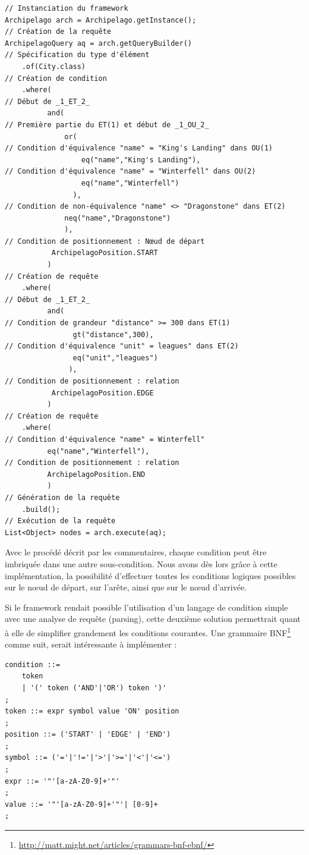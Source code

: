 \documentclass[a4paper,fleqn,12pt,oneside]{report}
\begin{document}
\begin{lstlisting}
// Instanciation du framework
Archipelago arch = Archipelago.getInstance();
// Création de la requête
ArchipelagoQuery aq = arch.getQueryBuilder()  
// Spécification du type d'élément
    .of(City.class) 						  
// Création de condition
    .where(									  
// Début de _1_ET_2_
    	  and( 							      
// Première partie du ET(1) et début de _1_OU_2_
              or(							  
// Condition d'équivalence "name" = "King's Landing" dans OU(1)
      	          eq("name","King's Landing"),
// Condition d'équivalence "name" = "Winterfell" dans OU(2)
    	          eq("name","Winterfell")     
    	        ),
// Condition de non-équivalence "name" <> "Dragonstone" dans ET(2)
    	      neq("name","Dragonstone")       
    	      ),
// Condition de positionnement : Nœud de départ
    	   ArchipelagoPosition.START          
    	  )
// Création de requête
    .where(     
// Début de _1_ET_2_                                  
          and(        
// Condition de grandeur "distance" >= 300 dans ET(1)                                 
      	        gt("distance",300),
// Condition d'équivalence "unit" = leagues" dans ET(2)           
    	        eq("unit","leagues")          
    	       ),
// Condition de positionnement : relation
    	   ArchipelagoPosition.EDGE           
    	  )
// Création de requête
    .where(
// Condition d'équivalence "name" = Winterfell"
          eq("name","Winterfell"),
// Condition de positionnement : relation
    	  ArchipelagoPosition.END
    	  )
// Génération de la requête
    .build();
// Exécution de la requête
List<Object> nodes = arch.execute(aq);

\end{lstlisting} 
Avec le procédé décrit par les commentaires, chaque condition peut être imbriquée dans une autre sous-condition. Nous avons dès lors grâce à cette implémentation, la possibilité d'effectuer toutes les conditions logiques possibles sur le nœud de départ, sur l'arête, ainsi que sur le nœud d'arrivée.

Si le framework rendait possible l'utilisation d'un langage de condition simple avec une analyse de requête (parsing), cette deuxième solution permettrait quant à elle de simplifier grandement les conditions courantes. Une grammaire BNF\footnote{\url{http://matt.might.net/articles/grammars-bnf-ebnf/}} comme suit, serait intéressante à implémenter :

\begin{lstlisting}
condition ::=
	token
	| '(' token ('AND'|'OR') token ')' 
;
token ::= expr symbol value 'ON' position 
;
position ::= ('START' | 'EDGE' | 'END') 
;
symbol ::= ('='|'!='|'>'|'>='|'<'|'<=') 
;
expr ::= '"'[a-zA-Z0-9]+'"' 
;
value ::= '"'[a-zA-Z0-9]+'"'| [0-9]+ 
;
\end{lstlisting}
\end{document}
